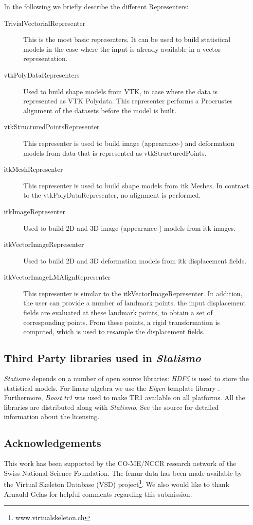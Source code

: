 \documentclass{InsightArticle}
\newcommand{\Statismo}{\emph{Statismo}\xspace}
\begin{document}
In the following we briefly describe the different Representers:
\begin{description}
\item[TrivialVectorialRepresenter] This is the most basic representers. It can be used to build statistical models in the case where the input is already available in a vector representation. 
\item[vtkPolyDataRepresenters] Used to build shape models from VTK, in case where the data is represented as VTK Polydata. This representer 
  performs a Procrustes alignment \cite{horn_closed-form_1987} of the datasets before the model is built. 
\item[vtkStructuredPointsRepresenter] This representer is used to
  build image (appearance-) and deformation models from data that is
  represented as vtkStructuredPoints. 
\item[itkMeshRepresenter] This representer is used to build shape
  models from itk Meshes.  In contrast to the vtkPolyDataRepresenter,
  no alignment is performed.
\item[itkImageRepresenter] Used to build 2D and 3D image (appearance-) models from itk images. 
\item[itkVectorImageRepresenter] Used to build 2D and 3D deformation models from itk displacement fields. 
\item[itkVectorImageLMAlignRepresenter] This representer is similar to the itkVectorImageRepresenter. 
  In addition, the user can provide a number of landmark points. the input displacement fields are evaluated
  at these landmark points, to obtain a set of corresponding points. From these points, a rigid transformation is computed, 
  which is used to resample the displacement fields. 

\end{description}

\subsection{Third Party libraries used in \Statismo}
\Statismo depends on a number of open source libraries: \emph{HDF5} \cite{hdf5} is used to store the statistical models. 
For linear algebra we use the \emph{Eigen} template library \cite{eigenweb}. Furthermore, \emph{Boost.tr1} was used to make TR1 available on all platforms. 
All the libraries are distributed along with \Statismo. See the source for detailed information about the licensing. 

\subsection*{Acknowledgements}
This work has been supported by the CO-ME/NCCR research network of
the Swiss National Science Foundation. The femur data has been made available by the Virtual Skeleton Database (VSD) project\footnote{www.virtualskeleton.ch}. We also would like to thank Arnauld Gelas for helpful comments regarding this
submission. 



%
%



\end{document}
